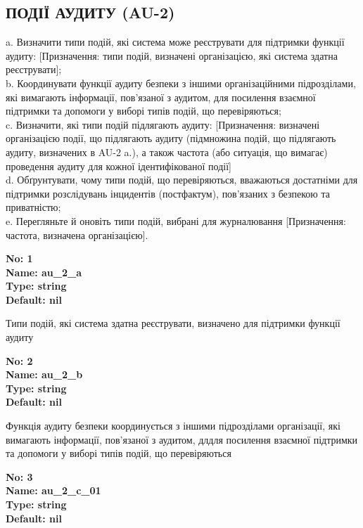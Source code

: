 \documentclass{article}
\begin{document}
\subsection{ПОДІЇ АУДИТУ (AU-2)}
a. Визначити типи подій, які система може реєструвати для підтримки функції аудиту: [Призначення: типи подій, визначені організацією, які система здатна реєструвати];\\ 
b. Координувати функції аудиту безпеки з іншими організаційними підрозділами, які вимагають інформації, пов'язаної з аудитом, для посилення взаємної підтримки та допомоги у виборі типів подій, що перевіряються;\\ 
c. Визначити, які типи подій підлягають аудиту: [Призначення: визначені організацією події, що підлягають аудиту (підмножина подій, що підлягають аудиту, визначених в AU-2 a.), а також частота (або ситуація, що вимагає) проведення аудиту для кожної ідентифікованої події]\\ 
d. Обґрунтувати, чому типи подій, що перевіряються, вважаються достатніми для підтримки розслідувань інцидентів (постфактум), пов'язаних з безпекою та приватністю;\\ 
e. Перегляньте й оновіть типи подій, вибрані для журналювання [Призначення: частота, визначена організацією].

\vspace{10pt}
{\footnotesize\bfseries
No: 1\\
Name: au\_\allowbreak{}2\_\allowbreak{}a\\
Type: string\\
Default: nil
}

{\footnotesize Типи подій, які система здатна реєструвати, визначено для підтримки функції аудиту}


{\footnotesize\bfseries
No: 2\\
Name: au\_\allowbreak{}2\_\allowbreak{}b\\
Type: string\\
Default: nil
}

{\footnotesize Функція аудиту безпеки координується з іншими підрозділами організації, які вимагають інформації, пов'язаної з аудитом, длдля посилення взаємної підтримки та допомоги у виборі типів подій, що перевіряються}


{\footnotesize\bfseries
No: 3\\
Name: au\_\allowbreak{}2\_\allowbreak{}c\_\allowbreak{}01\\
Type: string\\
Default: nil
}
\end{document}
